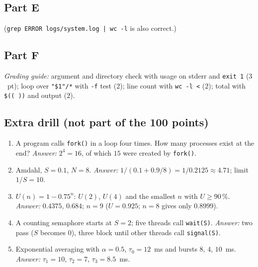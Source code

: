 \documentclass[11pt,a4paper]{article}
\newcommand{\cmd}[1]{\texttt{#1}}
\begin{document}
\subsection*{Part E}

(\cmd{grep ERROR logs/system.log | wc -l} is also correct.)



\subsection*{Part F}


\textit{Grading guide:} argument and directory check with usage on stderr and \texttt{exit 1} ($3$~pt); loop over \texttt{"\$1"/*} with \texttt{-f} test ($2$); line count with \cmd{wc -l <} ($2$); total with \texttt{\$(( ))} and output ($2$).

\subsection*{Extra drill (not part of the 100 points)}
\begin{enumerate}[leftmargin=1.6em]
  \item A program calls \cmd{fork()} in a loop four times. How many processes exist at the end? \emph{Answer:} $2^{4} = 16$, of which $15$ were created by \cmd{fork()}.
  \item Amdahl, $S = 0.1$, $N = 8$. \emph{Answer:} $1/(0.1 + 0.9/8) = 1/0.2125 \approx 4.71$; limit $1/S = 10$.
  \item $U(n) = 1 - 0.75^{n}$: $U(2)$, $U(4)$ and the smallest $n$ with $U \ge 90\,\%$. \emph{Answer:} $0.4375$, $0.684$; $n = 9$ ($U = 0.925$; $n = 8$ gives only $0.8999$).
  \item A counting semaphore starts at $S = 2$; five threads call \texttt{wait(S)}. \emph{Answer:} two pass ($S$ becomes $0$), three block until other threads call \texttt{signal(S)}.
  \item Exponential averaging with $\alpha = 0.5$, $\tau_0 = 12$~ms and bursts $8$, $4$, $10$~ms. \emph{Answer:} $\tau_1 = 10$, $\tau_2 = 7$, $\tau_3 = 8.5$~ms.
\end{enumerate}

\end{document}
